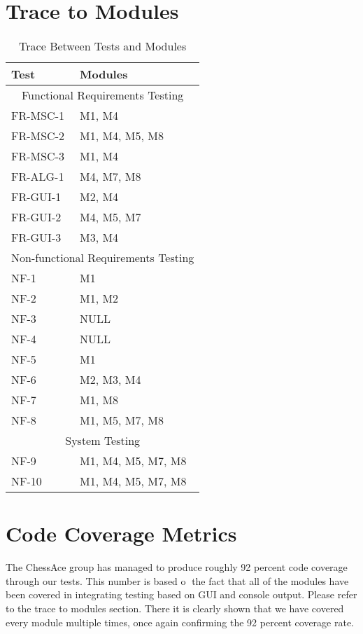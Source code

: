 \documentclass[12pt, titlepage]{article}
\begin{document}
\section{Trace to Modules}		
\begin{table}[!htbp]
\begin{tabular}{ll}
\toprule
Test & Modules \\
\midrule
\multicolumn{2}{c}{Functional Requirements Testing} \\
\midrule
FR-MSC-1 & M1, M4\\
FR-MSC-2 & M1, M4, M5, M8\\
FR-MSC-3 & M1, M4\\
FR-ALG-1 & M4, M7, M8\\
FR-GUI-1 & M2, M4\\
FR-GUI-2 & M4, M5, M7\\
FR-GUI-3 & M3, M4\\
\midrule
\multicolumn{2}{c}{Non-functional Requirements Testing} \\
\midrule
NF-1 & M1\\
NF-2 & M1, M2\\
NF-3 & NULL\\
NF-4 & NULL\\
NF-5 & M1\\
NF-6 & M2, M3, M4\\
NF-7 & M1, M8\\
NF-8 & M1, M5, M7, M8\\
\midrule
\multicolumn{2}{c}{System Testing} \\
\midrule
NF-9 & M1, M4, M5, M7, M8\\
NF-10 & M1, M4, M5, M7, M8\\
\bottomrule
\end{tabular}
\caption{Trace Between Tests and Modules}
\makeatletter
\def\rulecolor#1#{\CT@arc{#1}}
\def\CT@arc#1#2{%
\ifdim\baselineskip=\z@\noalign\fi
{\gdef\CT@arc@{\color#1{#2}}}}
\let\CT@arc@\relax
{}
\makeatother
\label{Table}
\end{table}

\section{Code Coverage Metrics}
The ChessAce group has managed to produce roughly 92 percent code coverage through our tests. This
number is based o the fact that all of the modules have been covered in integrating testing based on GUI and console output.
Please refer to the trace to modules section. There it is clearly shown that we have covered every module
multiple times, once again confirming the 92 percent coverage rate.



\end{document}
